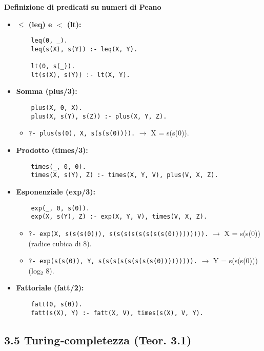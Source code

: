 \documentclass[12pt]{article}
\begin{document}
\textbf{Definizione di predicati su numeri di Peano}

\begin{itemize}
  \item \textbf{$\leq$ (leq) e $<$ (lt):}
    \begin{verbatim}
    leq(0, _).
    leq(s(X), s(Y)) :- leq(X, Y).

    lt(0, s(_)).
    lt(s(X), s(Y)) :- lt(X, Y).
    \end{verbatim}

  \item \textbf{Somma (plus/3):}
    \begin{verbatim}
    plus(X, 0, X).
    plus(X, s(Y), s(Z)) :- plus(X, Y, Z).
    \end{verbatim}
    \begin{itemize}
      \item \texttt{?- plus(s(0), X, s(s(s(0)))).} $\to$ X = s(s(0)).
    \end{itemize}

  \item \textbf{Prodotto (times/3):}
    \begin{verbatim}
    times(_, 0, 0).
    times(X, s(Y), Z) :- times(X, Y, V), plus(V, X, Z).
    \end{verbatim}

  \item \textbf{Esponenziale (exp/3):}
    \begin{verbatim}
    exp(_, 0, s(0)).
    exp(X, s(Y), Z) :- exp(X, Y, V), times(V, X, Z).
    \end{verbatim}
    \begin{itemize}
      \item \texttt{?- exp(X, s(s(s(0))), s(s(s(s(s(s(s(s(0))))))))).} $\to$ X = s(s(0)) (radice cubica di 8).
      \item \texttt{?- exp(s(s(0)), Y, s(s(s(s(s(s(s(s(0))))))))).} $\to$ Y = s(s(s(0))) (log$_2$ 8).
    \end{itemize}

  \item \textbf{Fattoriale (fatt/2):}
    \begin{verbatim}
    fatt(0, s(0)).
    fatt(s(X), Y) :- fatt(X, V), times(s(X), V, Y).
    \end{verbatim}
\end{itemize}

\subsection*{3.5 Turing‐completezza (Teor. 3.1)}
\end{document}

